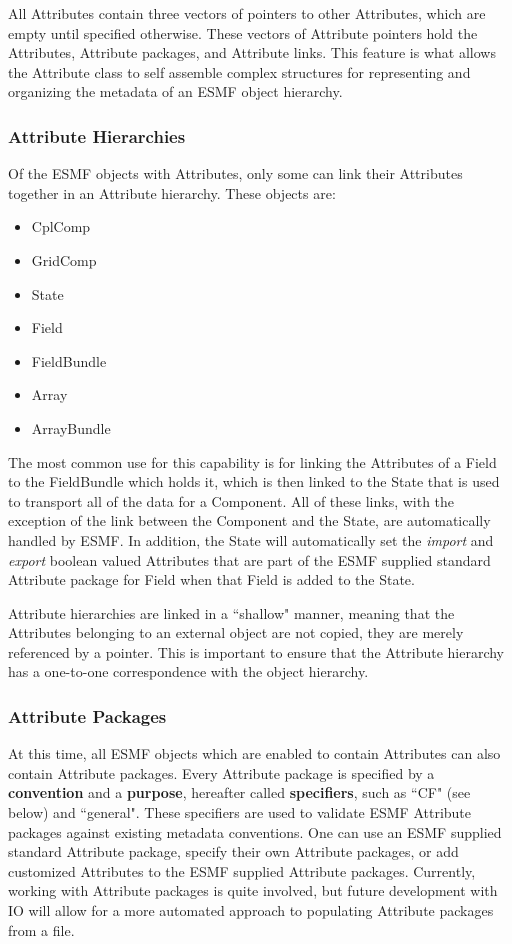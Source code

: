 All Attributes contain three vectors of pointers to other Attributes, which are empty until specified otherwise.  These vectors of Attribute pointers hold the Attributes, Attribute packages, and Attribute links.  This feature is what allows the Attribute class to self assemble complex structures for representing and organizing the metadata of an ESMF object hierarchy.

\subsubsection{Attribute Hierarchies}

Of the ESMF objects with Attributes, only some can link their Attributes together in an Attribute hierarchy.  These objects are:

\begin{itemize}
\item CplComp
\item GridComp
\item State
\item Field
\item FieldBundle
\item Array
\item ArrayBundle
\end{itemize}

The most common use for this capability is for linking the Attributes of a Field to the FieldBundle which holds it, which is then linked to the State that is used to transport all of the data for a Component.  All of these links, with the exception of the link between the Component and the State, are automatically handled by ESMF.  In addition, the State will automatically set the {\it import} and {\it export} boolean valued Attributes that are part of the ESMF supplied standard Attribute package for Field when that Field is added to the State. 

Attribute hierarchies are linked in a ``shallow" manner, meaning that the Attributes belonging to an external object are not copied, they are merely referenced by a pointer.  This is important to ensure that the Attribute hierarchy has a one-to-one correspondence with the object hierarchy.  

\subsubsection{Attribute Packages}
 \label{desc:AttPacks}

At this time, all ESMF objects which are enabled to contain Attributes can also contain Attribute packages.  Every Attribute package is specified by a {\bf convention} and a {\bf purpose}, hereafter called {\bf specifiers}, such as ``CF" (see below) and ``general".  These specifiers are used to validate ESMF Attribute packages against existing metadata conventions.  One can use an ESMF supplied standard Attribute package, specify their own Attribute packages, or add customized Attributes to the ESMF supplied Attribute packages.  Currently, working with Attribute packages is quite involved, but future development with IO will allow for a more automated approach to populating Attribute packages from a file.

